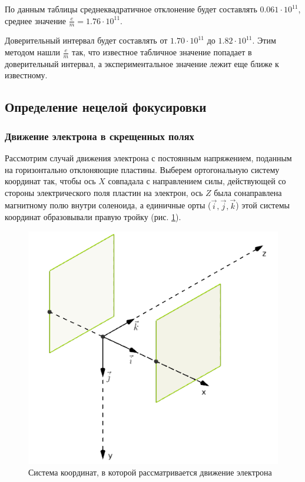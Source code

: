 По данным таблицы среднеквадратичное отклонение будет составлять $0.061\cdot10^{11}$, среднее значение $\frac{e}{m}=1.76\cdot10^{11}$.

Доверительный интервал будет составлять от $1.70\cdot10^{11}$ до $1.82\cdot10^{11}$. Этим методом нашли $\frac{e}{m}$ так, что известное табличное значение попадает в доверительный интервал, а экспериментальное значение лежит еще ближе к известному.

\newpage
\subsection{Определение нецелой фокусировки}

\subsubsection{Движение электрона в скрещенных полях}

Рассмотрим случай движения электрона с постоянным напряжением, поданным на горизонтально отклоняющие пластины. Выберем ортогональную систему координат так, чтобы ось $X$ совпадала с направлением силы, действующей со стороны электрического поля пластин на электрон, ось $Z$ была сонаправлена магнитному полю внутри соленоида, а единичные орты ($\vec{i},\vec{j},\vec{k}$) этой системы координат образовывали правую тройку (рис. \ref{fig:axes}).

\begin{figure}[h!]
	\centering
	\includegraphics[scale=0.5]{img/axes.png}
	\caption{Система координат, в которой рассматривается движение электрона}
	\label{fig:axes}
\end{figure}

